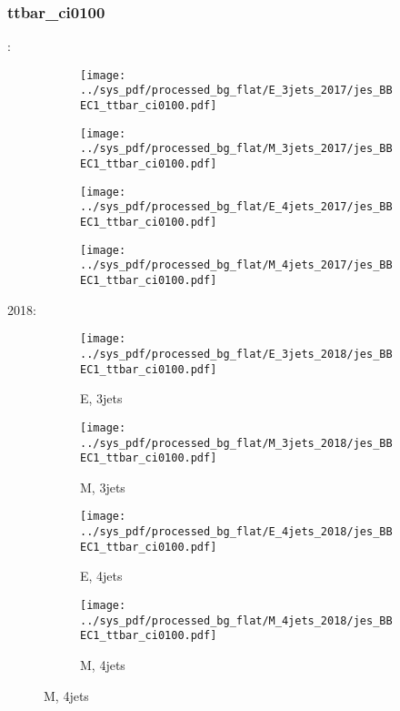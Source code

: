 \documentclass{beamer}
\begin{document}
\begin{frame}
\frametitle{ttbar_ci0100}
\fontsize{5}{1}:
\begin{figure}
\centering
\begin{subfigure}[b]{0.24\textwidth}
\texttt{[image: ../sys\_pdf/processed\_bg\_flat/E\_3jets\_2017/jes\_BBEC1\_ttbar\_ci0100.pdf]}
\end{subfigure}
\begin{subfigure}[b]{0.24\textwidth}
\texttt{[image: ../sys\_pdf/processed\_bg\_flat/M\_3jets\_2017/jes\_BBEC1\_ttbar\_ci0100.pdf]}
\end{subfigure}
\begin{subfigure}[b]{0.24\textwidth}
\texttt{[image: ../sys\_pdf/processed\_bg\_flat/E\_4jets\_2017/jes\_BBEC1\_ttbar\_ci0100.pdf]}
\end{subfigure}
\begin{subfigure}[b]{0.24\textwidth}
\texttt{[image: ../sys\_pdf/processed\_bg\_flat/M\_4jets\_2017/jes\_BBEC1\_ttbar\_ci0100.pdf]}
\end{subfigure}
\end{figure}
2018:
\begin{figure}
\centering
\begin{subfigure}[b]{0.24\textwidth}
\texttt{[image: ../sys\_pdf/processed\_bg\_flat/E\_3jets\_2018/jes\_BBEC1\_ttbar\_ci0100.pdf]}
\captionsetup{font=tiny}
\caption{E, 3jets}
\end{subfigure}
\begin{subfigure}[b]{0.24\textwidth}
\texttt{[image: ../sys\_pdf/processed\_bg\_flat/M\_3jets\_2018/jes\_BBEC1\_ttbar\_ci0100.pdf]}
\captionsetup{font=tiny}
\caption{M, 3jets}
\end{subfigure}
\begin{subfigure}[b]{0.24\textwidth}
\texttt{[image: ../sys\_pdf/processed\_bg\_flat/E\_4jets\_2018/jes\_BBEC1\_ttbar\_ci0100.pdf]}
\captionsetup{font=tiny}
\caption{E, 4jets}
\end{subfigure}
\begin{subfigure}[b]{0.24\textwidth}
\texttt{[image: ../sys\_pdf/processed\_bg\_flat/M\_4jets\_2018/jes\_BBEC1\_ttbar\_ci0100.pdf]}
\captionsetup{font=tiny}
\caption{M, 4jets}
\end{subfigure}
\end{figure}
\end{frame}
\end{document}
